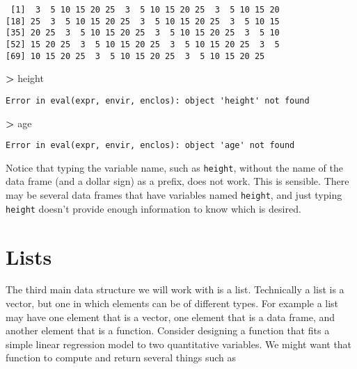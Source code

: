 \documentclass[]{krantz}
\makeatletter
\newenvironment{Shaded}{\begin{snugshade}}{\end{snugshade}}
\newcommand{\StringTok}[1]{\textcolor[rgb]{0.5,0.5,0.5}{#1}}
\newcommand{\OperatorTok}[1]{\textcolor[rgb]{0.43,0.43,0.43}{\textbf{#1}}}
\newcommand{\NormalTok}[1]{#1}
\newenvironment{kframe}{%
\medskip{}
\setlength{\fboxsep}{.8em}
 \def\at@end@of@kframe{}%
 \ifinner\ifhmode%
  \def\at@end@of@kframe{\end{minipage}}%
  \begin{minipage}{\columnwidth}%
 \fi\fi%
 \def\FrameCommand##1{\hskip\@totalleftmargin \hskip-\fboxsep
 \colorbox{shadecolor}{##1}\hskip-\fboxsep
     \hskip-\linewidth \hskip-\@totalleftmargin \hskip\columnwidth}%
 \MakeFramed {\advance\hsize-\width
   \@totalleftmargin\z@ \linewidth\hsize
   \@setminipage}}%
 {\par\unskip\endMakeFramed%
 \at@end@of@kframe}
\renewenvironment{Shaded}{\begin{kframe}}{\end{kframe}}
\theoremstyle{definition}
\theoremstyle{definition}
\theoremstyle{definition}
\theoremstyle{remark}
\makeatother
\begin{document}
\begin{Shaded}
\end{Shaded}

\begin{verbatim}
 [1]  3  5 10 15 20 25  3  5 10 15 20 25  3  5 10 15 20
[18] 25  3  5 10 15 20 25  3  5 10 15 20 25  3  5 10 15
[35] 20 25  3  5 10 15 20 25  3  5 10 15 20 25  3  5 10
[52] 15 20 25  3  5 10 15 20 25  3  5 10 15 20 25  3  5
[69] 10 15 20 25  3  5 10 15 20 25  3  5 10 15 20 25
\end{verbatim}

\begin{Shaded}
\begin{Highlighting}[]
\OperatorTok{>}\StringTok{ }\NormalTok{height}
\end{Highlighting}
\end{Shaded}

\begin{verbatim}
Error in eval(expr, envir, enclos): object 'height' not found
\end{verbatim}

\begin{Shaded}
\begin{Highlighting}[]
\OperatorTok{>}\StringTok{ }\NormalTok{age}
\end{Highlighting}
\end{Shaded}

\begin{verbatim}
Error in eval(expr, envir, enclos): object 'age' not found
\end{verbatim}

Notice that typing the variable name, such as \texttt{height}, without
the name of the data frame (and a dollar sign) as a prefix, does not
work. This is sensible. There may be several data frames that have
variables named \texttt{height}, and just typing \texttt{height} doesn't
provide enough information to know which is desired.

\section{Lists}\label{lists}

The third main data structure we will work with is a list. Technically a
list is a vector, but one in which elements can be of different types.
For example a list may have one element that is a vector, one element
that is a data frame, and another element that is a function. Consider
designing a function that fits a simple linear regression model to two
quantitative variables. We might want that function to compute and
return several things such as
\end{document}
